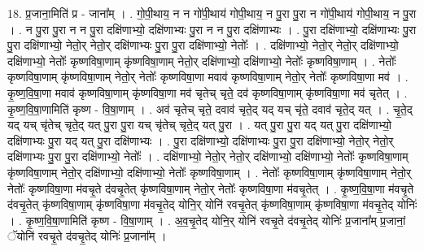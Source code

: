 \documentclass[17pt]{extarticle}
\begin{document}
18. प्र॒जाना॒मिति॑ प्र - जाना᳚म् । . गो॒पी॒थाय॒ न न गो॑पी॒थाय॑ गोपी॒थाय॒ न पु॒रा पु॒रा न गो॑पी॒थाय॑ गोपी॒थाय॒ न पु॒रा । . न पु॒रा पु॒रा न न पु॒रा दक्षि॑णाभ्यो॒ दक्षि॑णाभ्यः पु॒रा न न पु॒रा दक्षि॑णाभ्यः । . पु॒रा दक्षि॑णाभ्यो॒ दक्षि॑णाभ्यः पु॒रा पु॒रा दक्षि॑णाभ्यो॒ नेतो॒र् नेतो॒र् दक्षि॑णाभ्यः पु॒रा पु॒रा दक्षि॑णाभ्यो॒ नेतोः᳚ । . दक्षि॑णाभ्यो॒ नेतो॒र् नेतो॒र् दक्षि॑णाभ्यो॒ दक्षि॑णाभ्यो॒ नेतोः᳚ कृष्णविषा॒णाम् कृ॑ष्णविषा॒णाम् नेतो॒र् दक्षि॑णाभ्यो॒ दक्षि॑णाभ्यो॒ नेतोः᳚ कृष्णविषा॒णाम् । . नेतोः᳚ कृष्णविषा॒णाम् कृ॑ष्णविषा॒णाम् नेतो॒र् नेतोः᳚ कृष्णविषा॒णा मवाव॑ कृष्णविषा॒णाम् नेतो॒र् नेतोः᳚ कृष्णविषा॒णा मव॑ । . कृ॒ष्ण॒वि॒षा॒णा मवाव॑ कृष्णविषा॒णाम् कृ॑ष्णविषा॒णा मव॑ चृतेच् चृते॒ दव॑ कृष्णविषा॒णाम् कृ॑ष्णविषा॒णा मव॑ चृतेत् । . कृ॒ष्ण॒वि॒षा॒णामिति॑ कृष्ण - वि॒षा॒णाम् । . अव॑ चृतेच् चृते॒ दवाव॑ चृते॒द् यद् यच् चृ॑ते॒ दवाव॑ चृते॒द् यत् । . चृ॒ते॒द् यद् यच् चृ॑तेच् चृते॒द् यत् पु॒रा पु॒रा यच् चृ॑तेच् चृते॒द् यत् पु॒रा । . यत् पु॒रा पु॒रा यद् यत् पु॒रा दक्षि॑णाभ्यो॒ दक्षि॑णाभ्यः पु॒रा यद् यत् पु॒रा दक्षि॑णाभ्यः । . पु॒रा दक्षि॑णाभ्यो॒ दक्षि॑णाभ्यः पु॒रा पु॒रा दक्षि॑णाभ्यो॒ नेतो॒र् नेतो॒र् दक्षि॑णाभ्यः पु॒रा पु॒रा दक्षि॑णाभ्यो॒ नेतोः᳚ । . दक्षि॑णाभ्यो॒ नेतो॒र् नेतो॒र् दक्षि॑णाभ्यो॒ दक्षि॑णाभ्यो॒ नेतोः᳚ कृष्णविषा॒णाम् कृ॑ष्णविषा॒णाम् नेतो॒र् दक्षि॑णाभ्यो॒ दक्षि॑णाभ्यो॒ नेतोः᳚ कृष्णविषा॒णाम् । . नेतोः᳚ कृष्णविषा॒णाम् कृ॑ष्णविषा॒णाम् नेतो॒र् नेतोः᳚ कृष्णविषा॒णा म॑वचृ॒ते द॑वचृ॒तेत् कृ॑ष्णविषा॒णाम् नेतो॒र् नेतोः᳚ कृष्णविषा॒णा म॑वचृ॒तेत् । . कृ॒ष्ण॒वि॒षा॒णा म॑वचृ॒ते द॑वचृ॒तेत् कृ॑ष्णविषा॒णाम् कृ॑ष्णविषा॒णा म॑वचृ॒तेद् योनि॒र् योनि॑ रवचृ॒तेत् कृ॑ष्णविषा॒णाम् कृ॑ष्णविषा॒णा म॑वचृ॒तेद् योनिः॑ । . कृ॒ष्ण॒वि॒षा॒णामिति॑ कृष्ण - वि॒षा॒णाम् । . अ॒व॒चृ॒तेद् योनि॒र् योनि॑ रवचृ॒ते द॑वचृ॒तेद् योनिः॑ प्र॒जाना᳚म् प्र॒जानां॒ ॅयोनि॑ रवचृ॒ते द॑वचृ॒तेद् योनिः॑ प्र॒जाना᳚म् । \newline
\end{document}
